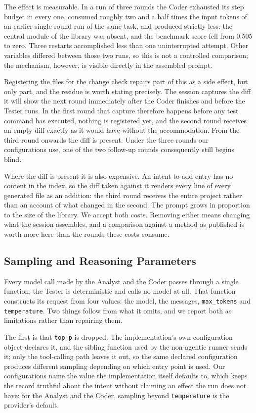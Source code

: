 The effect is measurable. In a run of three rounds the Coder exhausted its step
budget in every one, consumed roughly two and a half times the input tokens of
an earlier single-round run of the same task, and produced strictly less: the
central module of the library was absent, and the benchmark score fell from
0.505 to zero. Three restarts accomplished less than one uninterrupted attempt.
Other variables differed between those two runs, so this is not a controlled
comparison; the mechanism, however, is visible directly in the assembled
prompt.

Registering the files for the change check repairs part of this as a side
effect, but only part, and the residue is worth stating precisely. The session
captures the diff it will show the next round immediately after the Coder
finishes and before the Tester runs. In the first round that capture therefore
happens before any test command has executed, nothing is registered yet, and
the second round receives an empty diff exactly as it would have without the
accommodation. From the third round onwards the diff is present. Under the
three rounds our configurations use, one of the two follow-up rounds
consequently still begins blind.

Where the diff is present it is also expensive. An intent-to-add entry has no
content in the index, so the diff taken against it renders every line of every
generated file as an addition: the third round receives the entire project
rather than an account of what changed in the second. The prompt grows in
proportion to the size of the library. We accept both costs. Removing either
means changing what the session assembles, and a comparison against a method as
published is worth more here than the rounds these costs consume.

\subsection{Sampling and Reasoning Parameters}

Every model call made by the Analyst and the Coder passes through a single
function; the Tester is deterministic and calls no model at all. That function
constructs its request from four values: the model, the messages,
\texttt{max\_tokens} and \texttt{temperature}. Two things follow from what it
omits, and we report both as limitations rather than repairing them.

The first is that \texttt{top\_p} is dropped. The implementation's own
configuration object declares it, and the sibling function used by the
non-agentic runner sends it; only the tool-calling path leaves it out, so the
same declared configuration produces different sampling depending on which
entry point is used. Our configurations name the value the implementation
itself defaults to, which keeps the record truthful about the intent without
claiming an effect the run does not have: for the Analyst and the Coder,
sampling beyond \texttt{temperature} is the provider's default.

